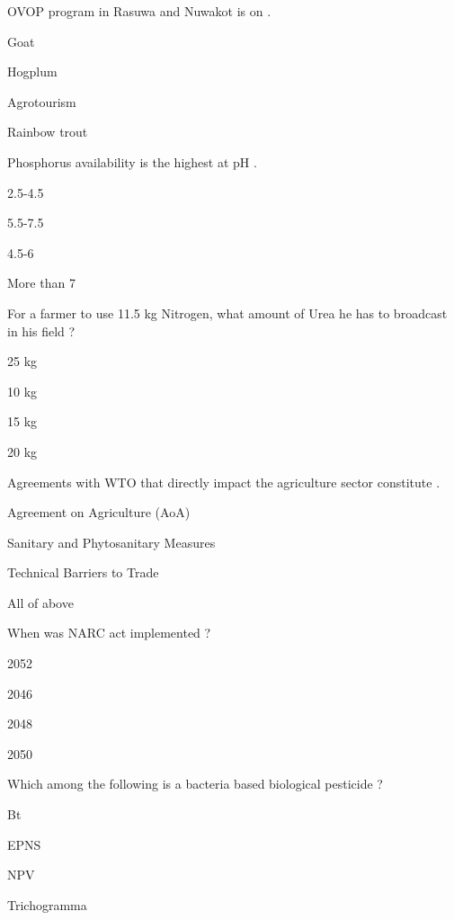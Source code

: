 \begin{questions}
\question OVOP program in Rasuwa and Nuwakot is on \fillin[][3cm].
\begin{items}
\item Goat
\item Hogplum
\item Agrotourism
\item* Rainbow trout
\end{items}

\question Phosphorus availability is the highest at pH \fillin[][3cm].
\begin{items}
\item 2.5-4.5
\item* 5.5-7.5
\item 4.5-6
\item More than 7
\end{items}

\question For a farmer to use 11.5 kg Nitrogen, what amount of Urea he has to broadcast in his field ?
\begin{items}
\item* 25 kg
\item 10 kg
\item 15 kg
\item 20 kg
\end{items}

\question Agreements with WTO that directly impact the agriculture sector constitute \fillin[][3cm].
\begin{items}
\item Agreement on Agriculture (AoA)
\item Sanitary and Phytosanitary Measures
\item Technical Barriers to Trade
\item* All of above
\end{items}

\question When was NARC act implemented ?
\begin{items}
\item 2052
\item 2046
\item* 2048
\item 2050
\end{items}

\question Which among the following is a bacteria based biological pesticide ?
\begin{items}
\item* Bt
\item EPNS
\item NPV
\item Trichogramma
\end{items}


\end{questions}

